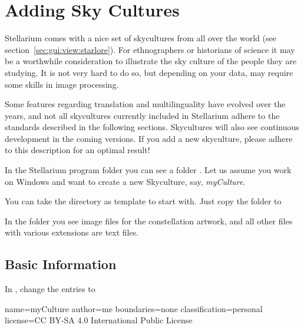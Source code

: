 

\chapter{Adding Sky Cultures}
\label{ch:SkyCultures}


\noindent Stellarium comes with a nice set of skycultures from all
over the world (see section~\ref{sec:gui:view:starlore}). For ethnographers or
historians of science it may be a worthwhile consideration to
illustrate the sky culture of the people they are studying. It is not
very hard to do so, but depending on your data, may require some
skills in image processing.

Some features regarding translation and multilinguality have evolved
over the years, and not all skycultures currently included in
Stellarium adhere to the standards described in the following
sections. Skycultures will also see continuous development in the
coming versions. If you add a new skyculture, please adhere to this
description for an optimal result!


In the Stellarium program folder you can see a folder
. Let us assume you work on Windows and want to create a
new Skyculture, say, \emph{myCulture}.

You can take the  directory as template to start with. Just copy the folder 
 to

In the folder you see image files for the constellation artwork, and all
other files with various extensions are text files. 


\section{Basic Information}
\label{sec:skycultures:info.ini}


In , change the entries to 
\begin{configfile}
[info]
name=myCulture
author=me
boundaries=none
classification=personal
license=CC BY-SA 4.0 International Public License
\end{configfile}

